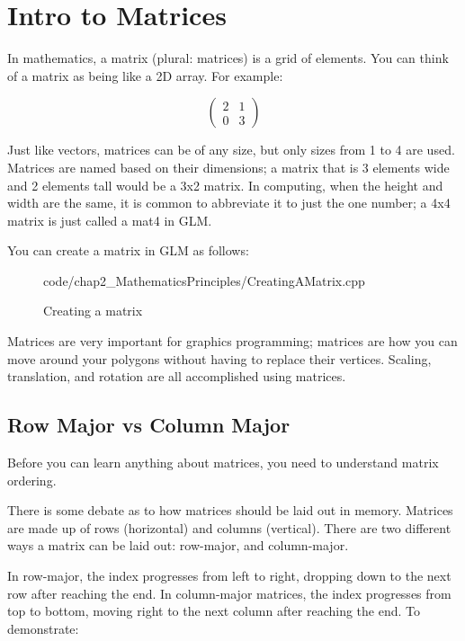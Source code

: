 \section{\textsf{Intro to Matrices}}
In mathematics, a matrix (plural: matrices) is a grid of elements. You can think of a matrix as being like a 2D array. For example:

\begin{equation*}
    \begin{pmatrix}
    2 & 1\\
    0 & 3
    \end{pmatrix}
\end{equation*}

Just like vectors, matrices can be of any size, but only sizes from 1 to 4 are used. Matrices are named based on their dimensions; a matrix that is 3 elements wide and 2 elements tall would be a 3x2 matrix. In computing, when the height and width are the same, it is common to abbreviate it to just the one number; a 4x4 matrix is just called a mat4 in GLM.

You can create a matrix in GLM as follows:

\begin{figure}[ht]
    \centering
    \colorbox{backgroundcolor}{
        \parbox{0.9\textwidth}{
            
            {code/chap2_MathematicsPrinciples/CreatingAMatrix.cpp}
        }
    }
    \caption{Creating a matrix}
    \label{fig:creating_a_matrix}
\end{figure}

Matrices are very important for graphics programming; matrices are how you can move around your polygons without having to replace their vertices. Scaling, translation, and rotation are all accomplished using matrices.

\subsection{\textsf{Row Major vs Column Major}}
Before you can learn anything about matrices, you need to understand matrix ordering.

There is some debate as to how matrices should be laid out in memory. Matrices are made up of rows (horizontal) and columns (vertical). There are two different ways a matrix can be laid out: row-major, and column-major.

In row-major, the index progresses from left to right, dropping down to the next row after reaching the end. In column-major matrices, the index progresses from top to bottom, moving right to the next column after reaching the end. To demonstrate:

